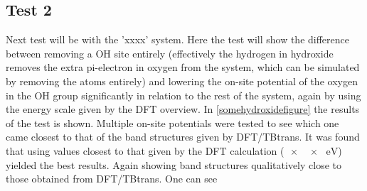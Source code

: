 \subsection{Test 2}
Next test will be with the 'xxxx' system. Here the test will show the difference between removing a OH site entirely (effectively the hydrogen in hydroxide removes the extra pi-electron in oxygen from the system, which can be simulated by removing the atoms entirely) and lowering the on-site potential of the oxygen in the OH group significantly in relation to the rest of the system, again by using the energy scale given by the DFT overview. In \cref{somehydroxidefigure} the results of the test is shown. Multiple on-site potentials were tested to see which one came closest to that of the band structures given by DFT/TBtrans. It was found that using values closest to that given by the DFT calculation (\(\SI{xx}{\electronvolt}\)) yielded the best results. Again showing band structures qualitatively close to those obtained from DFT/TBtrans. One can see
